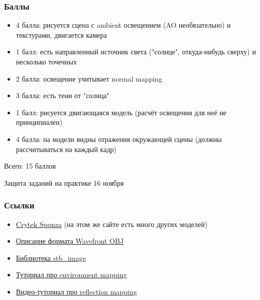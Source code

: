 \documentclass{beamer}
\begin{document}
\begin{frame}[fragile]
\frametitle{Баллы}
\begin{itemize}
\item 4 балла: рисуется сцена с ambient освещением (AO необязательно) и текстурами, двигается камера
\item 1 балл: есть направленный источник света ("солнце"{}, откуда-нибудь сверху) и несколько точечных
\item 2 балла: освещение учитывает normal mapping
\item 3 балла: есть тени от "солнца"
\item 1 балл: рисуется двигающаяся модель (расчёт освещения для неё не принципиален)
\item 4 балла: на модели видны отражения окружающей сцены (должны рассчитываться на каждый кадр)
\end{itemize}
Всего: 15 баллов

Защита заданий на практике 16 ноября
\end{frame}

\begin{frame}[fragile]
\frametitle{Ссылки}
\begin{itemize}
\item \href{https://casual-effects.com/g3d/data10/index.html#mesh8}{Crytek Sponza} (на этом же сайте есть много других моделей)
\item \href{https://en.wikipedia.org/wiki/Wavefront_.obj_file}{Описание формата Wavefront OBJ}
\item \href{https://github.com/nothings/stb/blob/master/stb_image.h}{Библиотека stb\_image}
\item \href{https://learnopengl.com/Advanced-OpenGL/Cubemaps}{Туториал про environment mapping}
\item \href{https://www.youtube.com/watch?v=xutvBtrG23A}{Видео-туториал про reflection mapping}
\end{itemize}
\end{frame}
\end{document}
